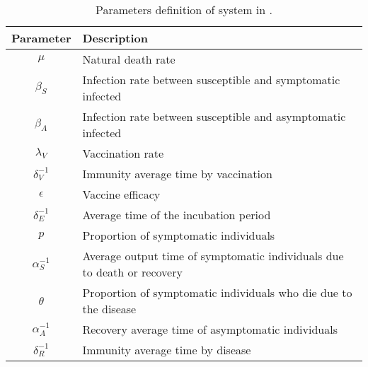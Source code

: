 \begin{table*}[tbh]
    \centering
    \begin{tabular}{cl}
        \toprule
        Parameter & Description
        \\
        \midrule
        $\mu$ &  Natural death rate
        \\
        $\beta_S$ & Infection rate between susceptible and symptomatic infected
        \\
        $\beta_A$ & Infection rate between susceptible and asymptomatic infected
        \\
        $\lambda_V$ & Vaccination rate
        \\
        $\delta_{V}^{-1}$ & Immunity average time by vaccination
        \\
        $\epsilon$ &  Vaccine efficacy
        \\
        $\delta_{E}^{-1}$ & Average time of the incubation period \\
        $p$ & Proportion of symptomatic individuals  \\
        $\alpha_{S}^{-1}$ &  Average output time of symptomatic
        individuals due to death or recovery  \\
        $\theta$ & Proportion of symptomatic individuals who die due to
        the disease \\
        $\alpha_{A}^{-1}$
        & Recovery average time of asymptomatic individuals
        \\
        $\delta_{R}^{-1}$
        &  Immunity average time by disease
        \\
        \bottomrule
    \end{tabular}
    \caption{Parameters definition of system in .}
    \label{table:parametermodel}
\end{table*}

